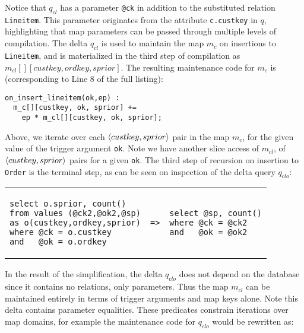 \vspace{1mm}
Notice that $q_{cl}$ has a parameter {\tt @ck} in addition to the substituted
relation {\tt Lineitem}. This parameter originates from the attribute
{\tt c.custkey} in $q$, highlighting that map parameters can be passed
through multiple levels of compilation.
The delta $q_{cl}$ is used to maintain the map $m_c$ on
insertions to {\tt Lineitem}, and is materialized in the third step of
compilation as $m_{cl}[][custkey,ordkey,sprior]$. The resulting maintenance code
for $m_{c}$ is (corresponding to Line 8 of the full listing):

{\footnotesize
\begin{verbatim}
on_insert_lineitem(ok,ep) :
  m_c[][custkey, ok, sprior] +=
    ep * m_cl[][custkey, ok, sprior];
\end{verbatim}
}

Above, we iterate over each ${\langle custkey,sprior\rangle}$ pair in the map $m_c$, for
the given value of the trigger argument {\tt ok}. Note we have another slice
access of $m_{cl}$, of ${\langle custkey,sprior\rangle}$ pairs for a given \texttt{ok}.
The third step of recursion on insertion to {\tt Order} is the terminal step, as
can be seen on inspection of the delta query $q_{clo}$:

\vspace{1mm}
\hspace{-5mm}
\begin{tabular}{lcl}
\begin{minipage}{1.68in}
\begin{verbatim}
select o.sprior, count()
from values (@ck2,@ok2,@sp)
as o(custkey,ordkey,sprior)
where @ck = o.custkey
and   @ok = o.ordkey
\end{verbatim}
\end{minipage}
&
{\tt =>}
&
\hspace{-3mm}
\begin{minipage}{1.3in}
\begin{verbatim}
select @sp, count()
where @ck = @ck2
and   @ok = @ok2
\end{verbatim}
\end{minipage}
\end{tabular}

\vspace{1mm}
In the result of the simplification, the delta $q_{clo}$ does not depend on the
database since it contains no relations, only parameters. Thus the map $m_{cl}$
can be maintained entirely in terms of trigger arguments and map keys alone.
Note this delta contains parameter equalities. These predicates constrain
iterations over map domains, for example the maintenance code for $q_{clo}$
would be rewritten as:

